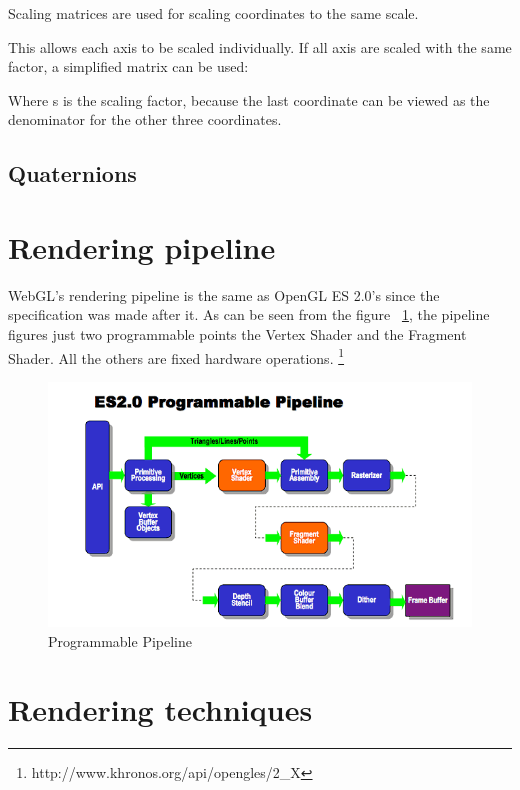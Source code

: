 Scaling matrices are used for scaling coordinates to the same scale.

 
This allows each axis to be scaled individually. If all axis are scaled with the same factor, a simplified matrix can be used:
 
 
Where s is the scaling factor, because the last coordinate can be viewed as the denominator for the other three coordinates.
 
\subsection{Quaternions}

\section{Rendering pipeline}

WebGL’s rendering pipeline is the same as OpenGL ES 2.0’s since the specification was made after it. As can be seen from the figure ~\ref{img:opengles1}, the pipeline figures just two programmable points the Vertex Shader and the Fragment Shader. All the others are fixed hardware operations. \footnote{http://www.khronos.org/api/opengles/2\_X}

 \begin{center}
	\begin{figure}[here]
		
		\includegraphics[width=\textwidth]{src/img/opengles2.png}
		\caption{Programmable Pipeline}
		\label{img:opengles1}
	\end{figure}
\end{center}

\section{Rendering techniques}

